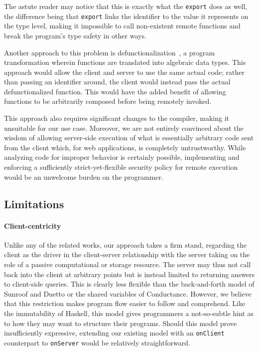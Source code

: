 \documentclass[preprint]{sigplanconf}
\begin{document}
The astute reader may notice that this is exactly what the \lstinline!export!
does as well, the difference being that \lstinline!export! links the identifier
to the value it represents on the type level, making it impossible to call
non-existent remote functions and break the program's type safety in other ways.

Another approach to this problem is
defunctionalization\ \cite{defunctionalization}, a program transformation
wherein functions are translated into algebraic data types. This approach would
allow the client and server to use the same actual code; rather than passing
an identifier around, the client would instead pass the actual defunctionalized
function. This would have the added benefit of allowing functions to be
arbitrarily composed before being remotely invoked.

This approach also requires significant changes to the compiler, making it
unsuitable for our use case. Moreover, we are not entirely convinced about the
wisdom of allowing server-side execution of what is essentially arbitrary code
sent from the client which, for web applications, is completely untrustworthy.
While analyzing code for improper behavior is certainly possible, implementing
and enforcing a sufficiently strict-yet-flexible security policy for remote
execution would be an unwelcome burden on the programmer.

\subsection{Limitations}
\label{sec:limitations}

\paragraph{Client-centricity} Unlike any of the related works, our approach
takes a firm stand, regarding the client as the driver in the client-server
relationship with the server taking on the role of a passive computational
or storage resource. The server may thus not call back into the client at
arbitrary points but is instead limited to returning answers to client-side
queries. This is clearly less flexible than the back-and-forth model of Sunroof
and Duetto or the shared variables of Conductance. However, we believe that
this restriction makes program flow easier to follow and comprehend. Like the
immutability of Haskell, this model gives programmers a not-so-subtle hint
as to how they may want to structure their programs. Should this model prove
insufficiently expressive, extending our existing model with an
\lstinline!onClient! counterpart to \lstinline!onServer! would be relatively
straightforward.
\end{document}
